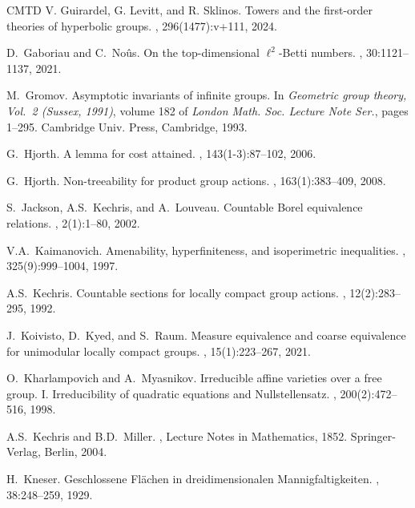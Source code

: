 \documentclass[11pt]{amsart}
\theoremstyle{definition}
\theoremstyle{plain}
\newcommand{\<}{\langle}
\renewcommand{\>}{\rangle}
\begin{document}
\begin{thebibliography}{CMTD}
V. Guirardel, G. Levitt, and R. Sklinos.
\newblock Towers and the first-order theories of hyperbolic groups.
, 296(1477):v+111, 2024.

D.~Gaboriau and C.~No{\^u}s.
\newblock On the top-dimensional $\ell^2$-{B}etti numbers.
,
  30:1121--1137, 2021.

M.~Gromov.
\newblock Asymptotic invariants of infinite groups.
\newblock In {\em Geometric group theory, {V}ol.\ 2 ({S}ussex, 1991)}, volume
  182 of {\em London Math. Soc. Lecture Note Ser.}, pages 1--295. Cambridge
  Univ. Press, Cambridge, 1993.
  
G.~Hjorth.
\newblock A lemma for cost attained.
, 143(1-3):87--102, 2006.

G.~Hjorth.
\newblock Non-treeability for product group actions.
, 163(1):383--409, 2008.

S.~Jackson, A.S.~Kechris, and A.~Louveau.
\newblock Countable {B}orel equivalence relations.
, 2(1):1--80, 2002.

V.A.~Kaimanovich.
\newblock Amenability, hyperfiniteness, and isoperimetric inequalities.
, 325(9):999--1004, 1997.

A.S.~Kechris.
\newblock Countable sections for locally compact group actions.
, 12(2):283--295, 1992.

J.~Koivisto, D.~Kyed, and S.~Raum.
\newblock Measure equivalence and coarse equivalence for unimodular locally
  compact groups.
, 15(1):223--267, 2021.

O.~Kharlampovich and A.~Myasnikov.
\newblock Irreducible affine varieties over a free group. {I}. {I}rreducibility
  of quadratic equations and {N}ullstellensatz.
, 200(2):472--516, 1998.

A.S.~Kechris and B.D.~Miller.
, Lecture Notes in
  Mathematics, 1852.
\newblock Springer-Verlag, Berlin, 2004.

H.~Kneser.
\newblock Geschlossene {F}l{\"a}chen in dreidimensionalen {M}annigfaltigkeiten.
,
  38:248--259, 1929.


\end{thebibliography}
\end{document}
